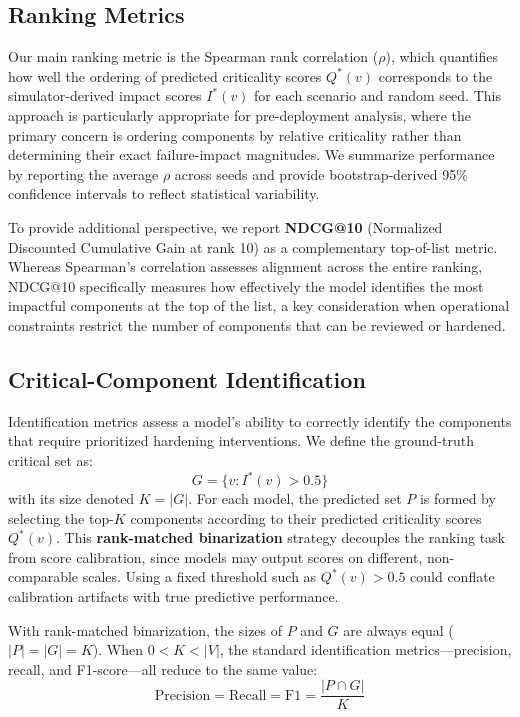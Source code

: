 \documentclass[review]{elsarticle}
\begin{document}
\subsection{Ranking Metrics}

Our main ranking metric is the Spearman rank correlation ($\rho$), which quantifies how well the
ordering of predicted criticality scores $Q^*(v)$ corresponds to the simulator-derived impact
scores $I^*(v)$ for each scenario and random seed. This approach is particularly appropriate for
pre-deployment analysis, where the primary concern is ordering components by relative criticality
rather than determining their exact failure-impact magnitudes. We summarize performance by
reporting the average $\rho$ across seeds and provide bootstrap-derived 95\% confidence intervals
to reflect statistical variability.

To provide additional perspective, we report \textbf{NDCG@10} (Normalized Discounted Cumulative
Gain at rank 10) as a complementary top-of-list metric. Whereas Spearman's correlation assesses
alignment across the entire ranking, NDCG@10 specifically measures how effectively the model
identifies the most impactful components at the top of the list, a key consideration when
operational constraints restrict the number of components that can be reviewed or hardened.

\subsection{Critical-Component Identification}

Identification metrics assess a model's ability to correctly identify the components that require
prioritized hardening interventions. We define the ground-truth critical set as:
\[
G = \{v : I^*(v) > 0.5\}
\]
with its size denoted $K=|G|$. For each model, the predicted set $P$ is formed by selecting the
top-$K$ components according to their predicted criticality scores $Q^*(v)$. This
\textbf{rank-matched binarization} strategy decouples the ranking task from score calibration,
since models may output scores on different, non-comparable scales. Using a fixed threshold such as
$Q^*(v)>0.5$ could conflate calibration artifacts with true predictive performance.

With rank-matched binarization, the sizes of $P$ and $G$ are always equal ($|P|=|G|=K$). When
$0<K<|V|$, the standard identification metrics---precision, recall, and F1-score---all reduce to
the same value:
\[
\text{Precision}=\text{Recall}=\text{F1}=\frac{|P\cap G|}{K}
\]
\end{document}
